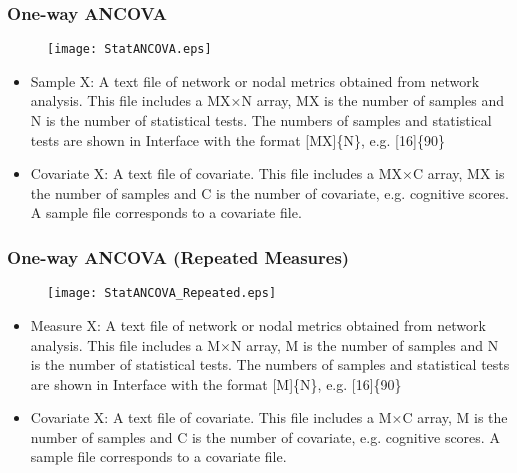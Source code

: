\documentclass[11pt]{article}
\begin{document}
            \subsubsection{One-way ANCOVA}
				\begin{figure}
					\begin{center}
						\texttt{[image: StatANCOVA.eps]}
					\end{center}
				\end{figure}
                \begin{itemize}
                    \item Sample X: A text file of network or nodal
                        metrics obtained from network analysis. This file
                        includes a MX$\times$N array, MX is the number of
                        samples and N is the number of statistical tests.
                        The numbers of samples and statistical tests are
                        shown in Interface with the format [MX]\{N\}, 
                        e.g. [16]\{90\}
                    \item Covariate X: A text file of covariate. This file
                        includes a MX$\times$C array, MX is the number of 
                        samples and C is the number of covariate, e.g. 
                        cognitive scores. A sample file 
                        corresponds to a covariate file.
                \end{itemize}
            \subsubsection{One-way ANCOVA (Repeated Measures)}
				\begin{figure}
					\begin{center}
						\texttt{[image: StatANCOVA\_Repeated.eps]}
					\end{center}
				\end{figure}
                \begin{itemize}
                    \item Measure X: A text file of network or nodal
                        metrics obtained from network analysis. This file
                        includes a M$\times$N array, M is the number of
                        samples and N is the number of statistical tests.
                        The numbers of samples and statistical tests are
                        shown in Interface with the format [M]\{N\}, 
                        e.g. [16]\{90\}
                    \item Covariate X: A text file of covariate. This file
                        includes a M$\times$C array, M is the number of 
                        samples and C is the number of covariate, e.g. 
                        cognitive scores. A sample file 
                        corresponds to a covariate file.
                \end{itemize}
\end{document}
